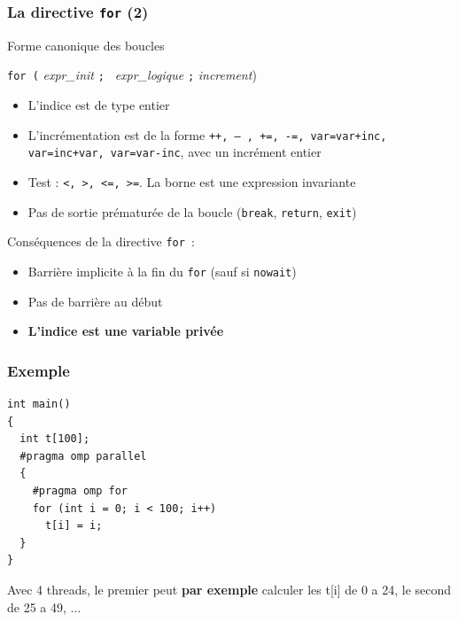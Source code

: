 \documentclass{beamer}
\begin{document}
\begin{frame}
  \frametitle{La directive  {\tt for} (2)}

  \begin{block}{Forme canonique des boucles}
  
 \centerline{ {\tt for (} {\it expr\_init} {\tt ; } {\it expr\_logique}
   {\tt ;} {\it increment})}
 
\begin{itemize}
\item   L'indice est de type entier

\item L'incrémentation est de la forme \texttt{++, --
, +=, -=, var=var+inc, var=inc+var, var=var-inc}, avec un incrément entier

\item Test : \texttt{<, >, <=, >=}. La borne est une expression invariante

\item Pas de sortie prématurée de la boucle ({\tt break},
  {\tt return}, {\tt exit})
\end{itemize}
\end{block}

\medskip

Conséquences de la directive {\tt for}~:
\begin{itemize}
\item Barrière implicite à la fin du {\tt for} (sauf si {\tt nowait})
\item Pas de barrière au début  
\item {\bf L'indice est une variable privée}
\end{itemize}

\end{frame}



\begin{frame}[fragile]
  \frametitle{Exemple}
\begin{verbatim}
int main()
{
  int t[100];
  #pragma omp parallel 
  {
    #pragma omp for  
    for (int i = 0; i < 100; i++)
      t[i] = i;
  }
}
\end{verbatim}

  Avec 4 threads, le premier peut {\bf par exemple} calculer les t[i] de 0 a 24, le second de 25 a 49,
  ...
  
\end{frame}
\end{document}
